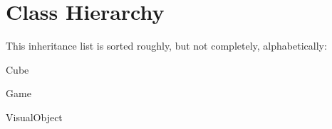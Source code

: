\section{Class Hierarchy}
This inheritance list is sorted roughly, but not completely, alphabetically\+:\begin{DoxyCompactList}
\item Cube\begin{DoxyCompactList}
\item {}
\item {}
\end{DoxyCompactList}
\item Game\begin{DoxyCompactList}
\item {}
\end{DoxyCompactList}
\item Visual\+Object\begin{DoxyCompactList}
\item {}
\item {}
\item {}
\end{DoxyCompactList}
\end{DoxyCompactList}
